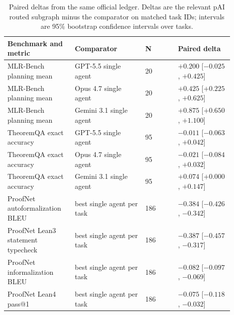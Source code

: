 \documentclass{article}
\begin{document}
\begin{table}[h]
\centering
\caption{Paired deltas from the same official ledger. Deltas are the relevant pAI routed subgraph minus the comparator on matched task IDs; intervals are 95\% bootstrap confidence intervals over tasks.}
\label{tab:paired_deltas}
\small
\begin{tabular}{@{}p{0.26\linewidth}p{0.29\linewidth}p{0.13\linewidth}p{0.22\linewidth}@{}}
\toprule
\textbf{Benchmark and metric} & \textbf{Comparator} & \textbf{N} & \textbf{Paired delta} \\
\midrule
MLR-Bench planning mean & GPT-5.5 single agent & 20 & $+0.200$ [$-0.025$, $+0.425$] \\
MLR-Bench planning mean & Opus 4.7 single agent & 20 & $+0.425$ [$+0.225$, $+0.625$] \\
MLR-Bench planning mean & Gemini 3.1 single agent & 20 & $+0.875$ [$+0.650$, $+1.100$] \\
TheoremQA exact accuracy & GPT-5.5 single agent & 95 & $-0.011$ [$-0.063$, $+0.042$] \\
TheoremQA exact accuracy & Opus 4.7 single agent & 95 & $-0.021$ [$-0.084$, $+0.032$] \\
TheoremQA exact accuracy & Gemini 3.1 single agent & 95 & $+0.074$ [$+0.000$, $+0.147$] \\
ProofNet autoformalization BLEU & best single agent per task & 186 & $-0.384$ [$-0.426$, $-0.342$] \\
ProofNet Lean3 statement typecheck & best single agent per task & 186 & $-0.387$ [$-0.457$, $-0.317$] \\
ProofNet informalization BLEU & best single agent per task & 186 & $-0.082$ [$-0.097$, $-0.069$] \\
ProofNet Lean4 pass@1 & best single agent per task & 186 & $-0.075$ [$-0.118$, $-0.032$] \\
\bottomrule
\end{tabular}
\end{table}
\end{document}
